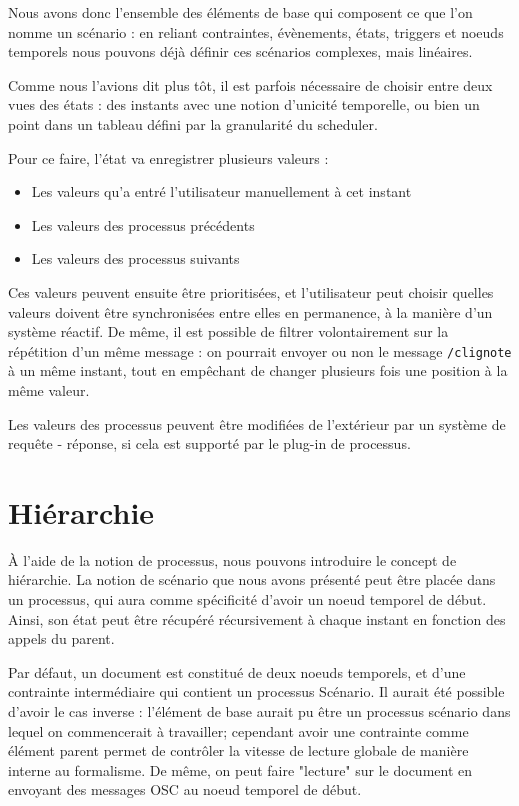 \documentclass{sigchi}
\begin{document}
Nous avons donc l'ensemble des éléments de base qui composent ce que l'on nomme un scénario : en reliant contraintes, évènements, états, triggers et noeuds temporels nous pouvons déjà définir ces scénarios complexes, mais linéaires.

Comme nous l'avions dit plus tôt, il est parfois nécessaire de choisir entre deux vues des états : des instants avec une notion d'unicité temporelle, ou bien un point dans un tableau défini par la granularité du scheduler.

Pour ce faire, l'état va enregistrer plusieurs valeurs : 
\begin{itemize}
\item Les valeurs qu'a entré l'utilisateur manuellement à cet instant
\item Les valeurs des processus précédents
\item Les valeurs des processus suivants
\end{itemize}

Ces valeurs peuvent ensuite être prioritisées, et l'utilisateur peut choisir quelles valeurs doivent être synchronisées entre elles en permanence, à la manière d'un système réactif. De même, il est possible de filtrer volontairement sur la répétition d'un même message : on pourrait envoyer ou non le message \verb|/clignote| à un même instant, tout en empêchant de changer plusieurs fois une position à la même valeur. 


Les valeurs des processus peuvent être modifiées de l'extérieur par un système de requête - réponse, si cela est supporté par le plug-in de processus.



\section{Hiérarchie}
À l'aide de la notion de processus, nous pouvons introduire le concept de hiérarchie. La notion de scénario que nous avons présenté peut être placée dans un processus, qui aura comme spécificité d'avoir un noeud temporel de début. Ainsi, son état peut être récupéré récursivement à chaque instant en fonction des appels du parent.

Par défaut, un document est constitué de deux noeuds temporels, et d'une contrainte intermédiaire qui contient un processus Scénario.
Il aurait été possible d'avoir le cas inverse : l'élément de base aurait pu être un processus scénario dans lequel on commencerait à travailler; cependant avoir une contrainte comme élément parent permet de contrôler la vitesse de lecture globale de manière interne au formalisme. De même, on peut faire "lecture" sur le document en envoyant des messages OSC au noeud temporel de début.
\end{document}

